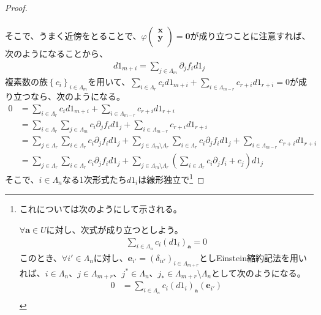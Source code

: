 \documentclass[dvipdfmx]{jsarticle}
\begin{document}
\begin{proof}
\begin{align*}
\end{align*}\par
そこで、うまく近傍をとることで、$\varphi\begin{pmatrix}
\mathbf{x} \\
\mathbf{y} \\
\end{pmatrix} = \mathbf{0}$が成り立つことに注意すれば、次のようになることから、
\begin{align*}
d1_{m + i} = \sum_{j \in \varLambda_{m}} {\partial_{j}f_{i}d1_{j}}
\end{align*}
複素数の族$\left\{ c_{i} \right\}_{i \in \varLambda_{m}}$を用いて、$\sum_{i \in \varLambda_{r}} {c_{i}d1_{m + i}} + \sum_{i \in \varLambda_{m - r}} {c_{r + i}d1_{r + i}} = 0$が成り立つなら、次のようになる。
\begin{align*}
0&= \sum_{i \in \varLambda_{r}} {c_{i}d1_{m + i}} + \sum_{i \in \varLambda_{m - r}} {c_{r + i}d1_{r + i}} \\
&= \sum_{i \in \varLambda_{r}} {\sum_{j \in \varLambda_{m}} {c_{i}\partial_{j}f_{i}d1_{j}}} + \sum_{i \in \varLambda_{m - r}} {c_{r + i}d1_{r + i}} \\
&= \sum_{j \in \varLambda_{r}} {\sum_{i \in \varLambda_{r}} {c_{i}\partial_{j}f_{i}}d1_{j}} + \sum_{j \in \varLambda_{m} \setminus \varLambda_{r}} {\sum_{i \in \varLambda_{r}} {c_{i}\partial_{j}f_{i}}d1_{j}} + \sum_{i \in \varLambda_{m - r}} {c_{r + i}d1_{r + i}} \\
&= \sum_{j \in \varLambda_{r}} {\sum_{i \in \varLambda_{r}} {c_{i}\partial_{j}f_{i}}d1_{j}} + \sum_{j \in \varLambda_{m} \setminus \varLambda_{r}} {\left( \sum_{i \in \varLambda_{r}} {c_{i}\partial_{j}f_{i}} + c_{j} \right)d1_{j}} 
\end{align*}
そこで、$i \in \varLambda_{n}$なる1次形式たち$d1_{i}$は線形独立で\footnote{これについては次のようにして示される。\par
$\forall \mathbf{a} \in U$に対し、次式が成り立つとしよう。
\begin{align*}
\sum_{i\in \varLambda_n } c_i \left(d1_i \right)_{\mathbf{a} } =0
\end{align*}
このとき、$\forall i'\in \varLambda_n $に対し、$\mathbf{e}_{i'} =\left( \delta_{ii'} \right)_{i\in \varLambda_{m+r}} $としEinstein縮約記法を用いれば、$i\in \varLambda_n $、$j\in \varLambda_{m+r} $、$j^* \in \varLambda_{n} $、$j_* \in \varLambda_{m+r} \setminus \varLambda_{n} $として次のようになる。
\begin{align*}
0&= \sum_{i\in \varLambda_n } c_i \left(d1_i \right)_{\mathbf{a} } \left( \mathbf{e}_{i'} \right) \\

\end{align*}}
\end{proof}
\end{document}
